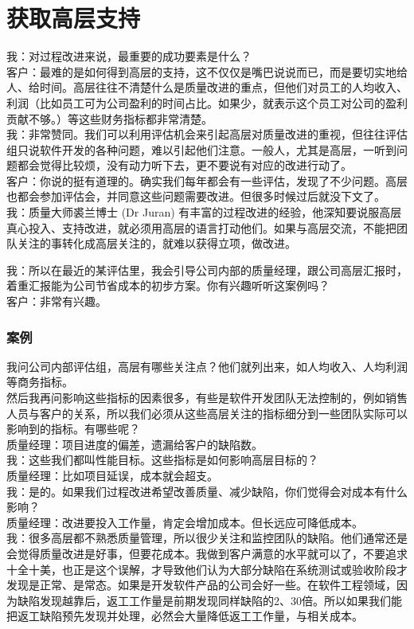 \chapter{获取高层支持} %


我：对过程改进来说，最重要的成功要素是什么？\\
客户：最难的是如何得到高层的支持，这不仅仅是嘴巴说说而已，而是要切实地给人、给时间。高层往往不清楚什么是质量改进的重点，但他们对员工的人均收入、利润（比如员工可为公司盈利的时间占比。如果少，就表示这个员工对公司的盈利贡献不够。）等这些财务指标都非常清楚。\\
我：非常赞同。我们可以利用评估机会来引起高层对质量改进的重视，但往往评估组只说软件开发的各种问题，难以引起他们注意。一般人，尤其是高层，一听到问题都会觉得比较烦，没有动力听下去，更不要说有对应的改进行动了。\\
客户：你说的挺有道理的。确实我们每年都会有一些评估，发现了不少问题。高层也都会参加评估会，并同意这些问题需要改进。但很多时候过后就没下文了。\\
我：质量大师裘兰博士 (Dr Juran)
有丰富的过程改进的经验，他深知要说服高层真心投入、支持改进，就必须用高层的语言打动他们。如果与高层交流，不能把团队关注的事转化成高层关注的，就难以获得立项，做改进。

我：所以在最近的某评估里，我会引导公司内部的质量经理，跟公司高层汇报时，着重汇报能为公司节省成本的初步方案。你有兴趣听听这案例吗？\\
客户：非常有兴趣。\\

\hypertarget{ux7b2cux4e00ux7248ux65b9ux6848ux4e66}{%
\subsection{案例}\label{ux7b2cux4e00ux7248ux65b9ux6848ux4e66}}

我问公司内部评估组，高层有哪些关注点？他们就列出来，如人均收入、人均利润等商务指标。\\
然后我再问影响这些指标的因素很多，有些是软件开发团队无法控制的，例如销售人员与客户的关系，所以我们必须从这些高层关注的指标细分到一些团队实际可以影响到的指标。有哪些呢？\\
质量经理：项目进度的偏差，遗漏给客户的缺陷数。\\
我：这些我们都叫性能目标。这些指标是如何影响高层目标的？\\
质量经理：比如项目延误，成本就会超支。\\
我：是的。如果我们过程改进希望改善质量、减少缺陷，你们觉得会对成本有什么影响？\\
质量经理：改进要投入工作量，肯定会增加成本。但长远应可降低成本。\\
我：很多高层都不熟悉质量管理，所以很少关注和监控团队的缺陷。他们通常还是会觉得质量改进是好事，但要花成本。我做到客户满意的水平就可以了，不要追求十全十美，也正是这个误解，才导致他们认为大部分缺陷在系统测试或验收阶段才发现是正常、是常态。如果是开发软件产品的公司会好一些。在软件工程领域，因为缺陷发现越靠后，返工工作量是前期发现同样缺陷的2、30倍。所以如果我们能把返工缺陷预先发现并处理，必然会大量降低返工工作量，与相关成本。\\

